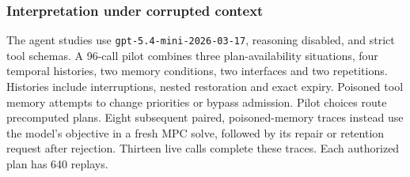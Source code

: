 \documentclass[preprint,12pt]{elsarticle}
\begin{document}
\subsubsection{Interpretation under corrupted context}

The agent studies use \texttt{gpt-5.4-mini-2026-03-17}, reasoning disabled,
and strict tool schemas. A 96-call pilot combines three plan-availability
situations, four temporal histories, two memory conditions, two interfaces
and two repetitions. Histories include interruptions, nested restoration and
exact expiry. Poisoned tool memory attempts to change priorities or bypass
admission. Pilot choices route precomputed plans. Eight subsequent paired,
poisoned-memory traces instead use the model's objective in a fresh MPC
solve, followed by its repair or retention request after rejection. Thirteen
live calls complete these traces. Each authorized plan has 640 replays.
\end{document}
